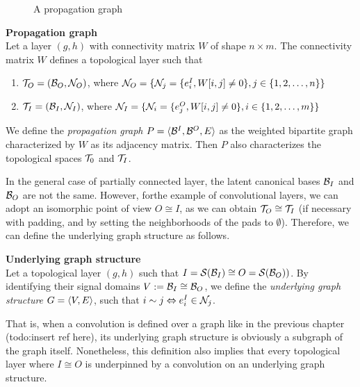 \begin{figure}[H]
\centering
{}
\caption{A propagation graph}
\label{fig:pgraph}
\end{figure}

\begin{lemma}\textbf{Propagation graph}\\
Let a layer $(g,h)$ with connectivity matrix $W$ of shape $n \times m$. The connectivity matrix $W$ defines a topological layer such that
\begin{enumerate}
  \item $\mathcal{T}_O = (\mathcal{B}_O, \mathcal{N}_O)$, where $\mathcal{N}_O = \{ \mathcal{N}_j = \{ e^I_i, W[i,j] \neq 0 \}, j \in \{1, 2, \ldots, n\}\}$
  \item $\mathcal{T}_I = (\mathcal{B}_I, \mathcal{N}_I)$, where $\mathcal{N}_I = \{ \mathcal{N}_i = \{ e^O_j, W[i,j] \neq 0 \}, i \in \{1, 2, \ldots, m\}\}$
\end{enumerate}
We define the \emph{propagation graph} $P = \langle \mathcal{B}^I, \mathcal{B}^O, E \rangle$ as the weighted bipartite graph characterized by $W$ as its adjacency matrix. Then $P$ also characterizes the topological spaces $\mathcal{T}_0$ and $\mathcal{T}_I$.
\end{lemma}

In the general case of partially connected layer, the latent canonical bases $\mathcal{B}_I$ and $\mathcal{B}_O$ are not the same. However, forthe example of convolutional layers, we can adopt an isomorphic point of view $O \cong I$, as we can obtain $\mathcal{T}_O \cong \mathcal{T}_I$ (if necessary with padding, and by setting the neighborhoods of the pads to $\emptyset$). Therefore, we can define the underlying graph structure as follows.

\begin{definition}\textbf{Underlying graph structure}\\
Let a topological layer $(g,h)$ such that $I = \mathcal{S}(\mathcal{B}_I) \cong O = \mathcal{S}(\mathcal{B}_O))$. By identifying their signal domains $V := \mathcal{B}_I \cong \mathcal{B}_O$, we define the \emph{underlying graph structure} $G = \langle V, E \rangle$, such that $i \sim j \Leftrightarrow e^I_i \in \mathcal{N}_j$.
\end{definition}

That is, when a convolution is defined over a graph like in the previous chapter (todo:insert ref here), its underlying graph structure is obviously a subgraph of the graph itself. Nonetheless, this definition also implies that every topological layer where $I \cong O$ is underpinned by a convolution on an underlying graph structure.

